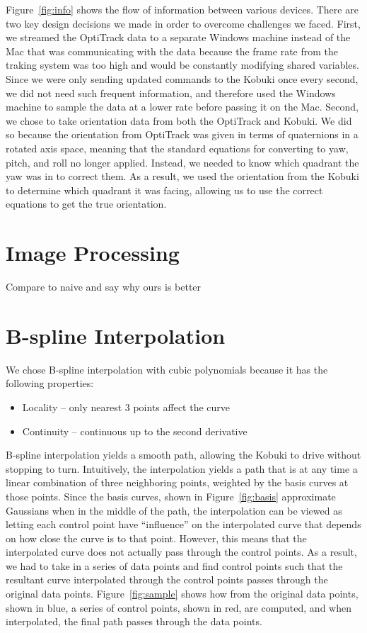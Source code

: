 \documentclass[10pt]{article}
\begin{document}
\begin{multicols*}{2}
  Figure~\ref{fig:info} shows the flow of information between various devices.
  There are two key design decisions we made in order to overcome challenges we
  faced. First, we streamed the OptiTrack data to a separate Windows machine
  instead of the Mac that was communicating with the data because the frame rate
  from the traking system was too high and would be constantly modifying shared
  variables. Since we were only sending updated commands to the Kobuki once
  every second, we did not need such frequent information, and therefore used
  the Windows machine to sample the data at a lower rate before passing it on
  the Mac. Second, we chose to take orientation data from both the OptiTrack and
  Kobuki. We did so because the orientation from OptiTrack was given in terms of
  quaternions in a rotated axis space, meaning that the standard equations for
  converting to yaw, pitch, and roll no longer applied. Instead, we needed to
  know which quadrant the yaw was in to correct them. As a result, we used the
  orientation from the Kobuki to determine which quadrant it was facing,
  allowing us to use the correct equations to get the true orientation.

  \section*{Image Processing}
  Compare to naive and say why ours is better

  \section*{B-spline Interpolation}
  We chose B-spline interpolation with cubic polynomials because it has the
  following properties: \cite{fuhuacheng2012}
  \begin{itemize}
    \item Locality -- only nearest 3 points affect the curve
    \item Continuity -- continuous up to the second derivative
  \end{itemize}
  B-spline interpolation yields a smooth path, allowing the Kobuki to drive
  without stopping to turn. Intuitively, the interpolation yields a path that is
  at any time a linear combination of three neighboring points, weighted by the
  basis curves at those points. Since the basis curves, shown in
  Figure~\ref{fig:basis} approximate Gaussians when in the middle of the path,
  the interpolation can be viewed as letting each control point have
  ``influence'' on the interpolated curve that depends on how close the curve is
  to that point. However, this means that the interpolated curve does not
  actually pass through the control points. As a result, we had to take in a
  series of data points and find control points such that the resultant curve
  interpolated through the control points passes through the original data
  points. Figure~\ref{fig:sample} shows how from the original data points, shown
  in blue, a series of control points, shown in red, are computed, and when
  interpolated, the final path passes through the data points.


\end{multicols*}
\end{document}
